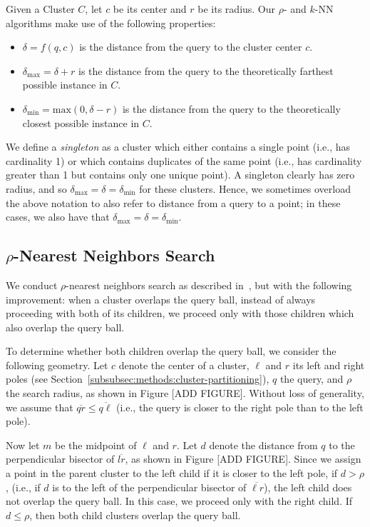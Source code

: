 Given a Cluster $C$, let $c$ be its center and $r$ be its radius. Our $\rho$- and $k$-NN algorithms make use of the following properties:

\begin{itemize}
    \item $\delta = f(q, c)$ is the distance from the query to the cluster center $c$.
    \item $\delta_{\max} = \delta + r$ is the distance from the query to the theoretically farthest possible instance in $C$.
    \item $\delta_{\min} = \text{max}(0, \delta - r)$ is the distance from the query to the theoretically closest possible instance in $C$.
\end{itemize}

We define a \emph{singleton} as a cluster which either contains a single point (i.e., has cardinality 1) or which contains 
duplicates of the same point (i.e., has cardinality greater than 1 but contains only one unique point).
A singleton clearly has zero radius, and so $\delta_{\max} = \delta = \delta_{\min}$ for these clusters.
Hence, we sometimes overload the above notation to also refer to distance from a query to a point;
in these cases, we also have that $\delta_{\max} = \delta = \delta_{\min}$.


\subsection{\texorpdfstring{$\rho$}{p}-Nearest Neighbors Search}
\label{subsec:methods:rnn-search}

We conduct $\rho$-nearest neighbors search as described in~\cite{ishaq2019clustered}, but with the following improvement:
when a cluster overlaps the query ball, instead of always proceeding with both of its children, we proceed only with those children which also overlap the query ball.

To determine whether both children overlap the query ball, we consider the following geometry. 
Let $c$ denote the center of a cluster, $\ell$ and $r$ its left and right poles (see Section~\ref{subsubsec:methods:cluster-partitioning}), $q$ the query, and $\rho$ the search radius, as shown in Figure [ADD FIGURE].
Without loss of generality, we assume that $\overline{qr} \leq \overline{q\ell}$ (i.e., the query is closer to the right pole than to the left pole). 

Now let $m$ be the midpoint of $\ell$ and $r$. Let $d$ denote the distance from $q$ to the perpendicular bisector of $\overline{lr}$, as shown in Figure [ADD FIGURE]. Since we assign a point in the parent cluster to the left child if it is closer to the left pole, if $d > \rho$, (i.e., if $d$ is to the left of the perpendicular bisector of $\overline{\ell r}$), 
the left child does not overlap the query ball. In this case, we proceed only with the right child. If $d \leq \rho$, 
then both child clusters overlap the query ball. 

